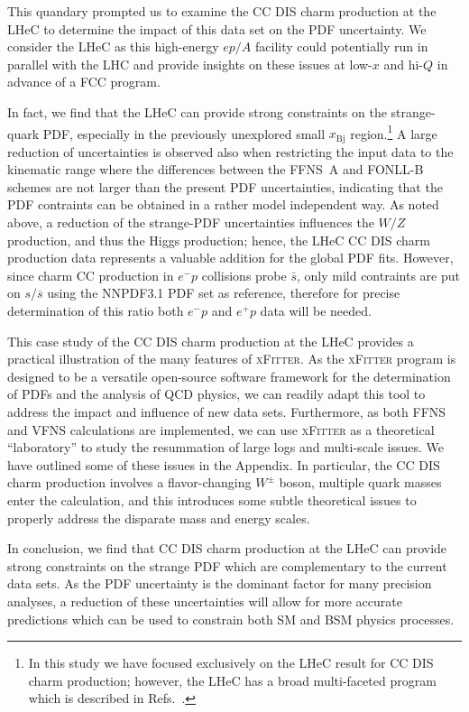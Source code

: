 \documentclass[pdftex,twocolumn,epjc3]{svjour3}          %
\newcommand{\xfitter} {\textsc{xFitter}\xspace}
\newcommand{\xbj}{\ensuremath{x_{\text{Bj}}}\xspace}
\newcommand{\fonll} {{FONLL-B}\xspace}
\newcommand{\ffns} {{FFNS~A}\xspace}
\newcommand\new[1]{{\color{blue} #1}}
\begin{document}
This quandary prompted us to examine the CC DIS charm production at
the LHeC to determine the impact of this data set on the PDF
uncertainty.
%
We consider the LHeC  as this  high-energy $ep/A$
facility  could potentially run in parallel with the LHC and
provide insights on these issues at low-$x$ and hi-$Q$ in advance of a FCC program.



In fact, we find that the LHeC can provide strong constraints on the
strange-quark PDF, especially in the previously unexplored small \xbj
region.\footnote{In this study we have focused exclusively on the LHeC
  result for CC DIS charm production; however, the LHeC has a broad
  multi-faceted program which is described in
  Refs.~\cite{AbelleiraFernandez:2012ty,Klein:2018rhq}.}
%
\new{A large reduction of uncertainties is observed also when restricting 
the input data to the kinematic range where the differences between the \ffns and 
\fonll schemes are not larger than the present PDF uncertainties, indicating 
that the PDF contraints can be obtained in a rather model independent way.}
As noted above, a reduction of the strange-PDF uncertainties
influences the $W/Z$ production, and thus the Higgs production; hence,
the LHeC CC DIS charm production data represents a valuable addition
for the global PDF fits. 
\new{However, since charm CC production in $e^{-}p$ 
collisions probe $\bar{s}$, only mild contraints are put on $s/\overline{s}$ 
using the NNPDF3.1 PDF set as reference, therefore for precise 
determination of this ratio both $e^{-}p$ and $e^{+}p$ data will be needed.}

This case study of the CC DIS charm production at the LHeC provides a
practical illustration of the many features of \xfitter.
%
As the \xfitter program is designed to be a versatile open-source
software framework for the determination of PDFs and the analysis of
QCD physics, we can readily adapt this tool to address the impact and
influence of new data sets.
%
Furthermore, as both FFNS and VFNS calculations are implemented, we
can use \xfitter as a theoretical ``laboratory'' to study the
resummation of large logs and multi-scale issues.
%
We have outlined some of these issues in the Appendix.
%
In particular, the CC DIS charm production involves a flavor-changing
$W^\pm$ boson, multiple quark masses enter the calculation, and this
introduces some subtle theoretical issues to properly address the
disparate mass and energy scales.

In conclusion, we find that CC DIS charm production at the LHeC can
provide strong constraints on the strange PDF which are complementary
to the current data sets.
%
As the PDF uncertainty is the dominant factor for many precision
analyses, a reduction of these uncertainties will allow for more
accurate predictions which can be used to constrain both SM and BSM
physics processes.
\end{document}
